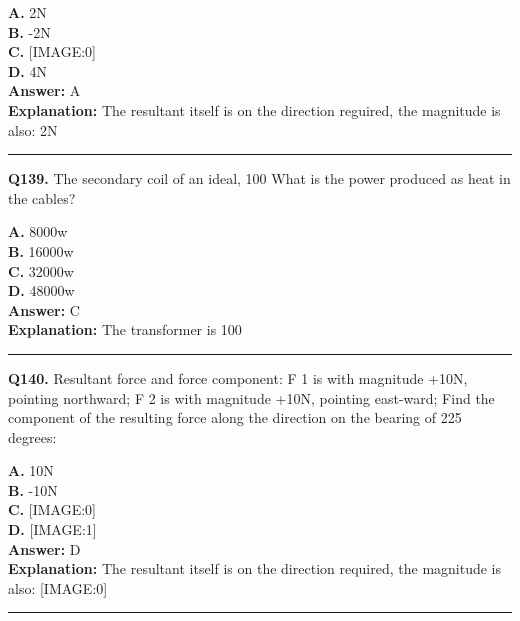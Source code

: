\documentclass[12pt]{article}
\begin{document}
\textbf{A.} 2N \\
\textbf{B.} -2N \\
\textbf{C.} [IMAGE:0] \\
\textbf{D.} 4N \\

\textbf{Answer:} A \\
\textbf{Explanation:} The resultant itself is on the direction reguired, the magnitude is also: 2N

\hrule
\vspace{1em}


\noindent
\textbf{Q139.} The secondary coil of an ideal, 100%
What is the power produced as heat in the cables?



\textbf{A.} 8000w \\
\textbf{B.} 16000w \\
\textbf{C.} 32000w \\
\textbf{D.} 48000w \\

\textbf{Answer:} C \\
\textbf{Explanation:} The transformer is 100%

\hrule
\vspace{1em}


\noindent
\textbf{Q140.} Resultant force and force component:
F
1
is with magnitude +10N, pointing northward; F
2
is with magnitude +10N, pointing east-ward; Find the component of the resulting force along the direction on the bearing of 225 degrees:



\textbf{A.} 10N \\
\textbf{B.} -10N \\
\textbf{C.} [IMAGE:0] \\
\textbf{D.} [IMAGE:1] \\

\textbf{Answer:} D \\
\textbf{Explanation:} The resultant itself is on the direction required, the magnitude is also:
[IMAGE:0]

\hrule
\vspace{1em}
\end{document}
